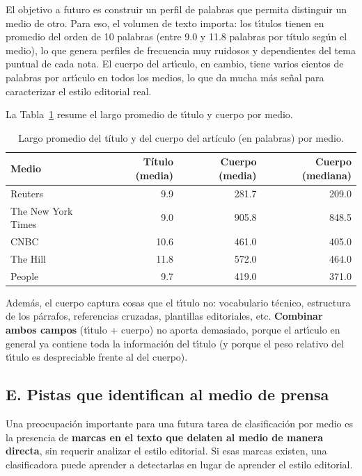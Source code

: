 \documentclass[11pt,a4paper]{article}
\begin{document}
El objetivo a futuro es construir un perfil de palabras que permita distinguir un medio de otro. Para eso, el volumen de texto importa: los t\'{\i}tulos tienen en promedio del orden de 10 palabras (entre 9.0 y 11.8 palabras por t\'itulo seg\'un el medio), lo que genera perfiles de frecuencia muy ruidosos y dependientes del tema puntual de cada nota. El cuerpo del art\'{\i}culo, en cambio, tiene varios cientos de palabras por art\'{\i}culo en todos los medios, lo que da mucha m\'{a}s se\~{n}al para caracterizar el estilo editorial real.

La Tabla~\ref{tab:lenfields} resume el largo promedio de t\'{\i}tulo y cuerpo por medio.

\begin{table}[H]
\centering
\caption{Largo promedio del t\'itulo y del cuerpo del art\'iculo (en palabras) por medio.}
\label{tab:lenfields}
\begin{tabular}{l r r r}
\toprule
\textbf{Medio} & \textbf{T\'itulo (media)} & \textbf{Cuerpo (media)} & \textbf{Cuerpo (mediana)} \\
\midrule
Reuters & 9.9 & 281.7 & 209.0 \\
The New York Times & 9.0 & 905.8 & 848.5 \\
CNBC & 10.6 & 461.0 & 405.0 \\
The Hill & 11.8 & 572.0 & 464.0 \\
People & 9.7 & 419.0 & 371.0 \\
\bottomrule
\end{tabular}
\end{table}

Adem\'{a}s, el cuerpo captura cosas que el t\'{\i}tulo no: vocabulario t\'{e}cnico, estructura de los p\'{a}rrafos, referencias cruzadas, plantillas editoriales, etc. \textbf{Combinar ambos campos} (t\'{\i}tulo + cuerpo) no aporta demasiado, porque el art\'{\i}culo en general ya contiene toda la informaci\'{o}n del t\'{\i}tulo (y porque el peso relativo del t\'{\i}tulo es despreciable frente al del cuerpo).


\subsection{E. Pistas que identifican al medio de prensa}

Una preocupaci\'{o}n importante para una futura tarea de clasificaci\'{o}n por medio es la presencia de \textbf{marcas en el texto que delaten al medio de manera directa}, sin requerir analizar el estilo editorial. Si esas marcas existen, una clasificadora puede aprender a detectarlas en lugar de aprender el estilo editorial.
\end{document}
